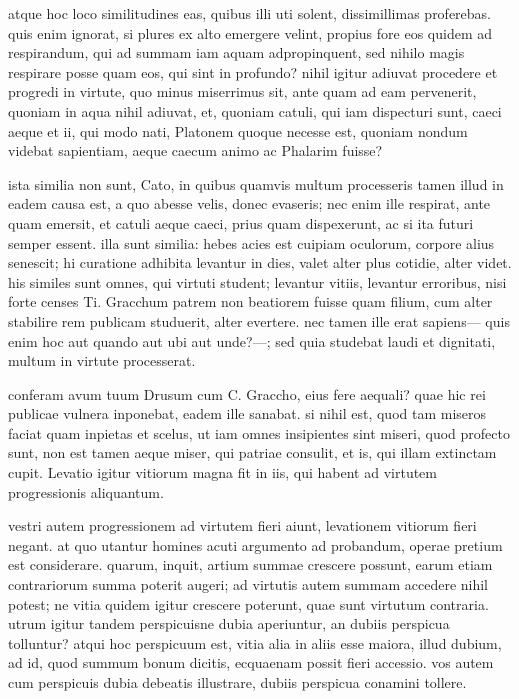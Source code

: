  atque hoc loco similitudines eas, quibus illi uti solent, dissimillimas proferebas. quis enim ignorat, si plures ex alto emergere velint, propius fore eos quidem ad respirandum, qui ad summam iam aquam adpropinquent, sed nihilo magis respirare posse quam eos, qui sint in profundo? nihil igitur adiuvat procedere et progredi in virtute, quo minus miserrimus sit, ante quam ad eam pervenerit, quoniam in aqua nihil adiuvat, et, quoniam catuli, qui iam dispecturi sunt, caeci aeque et ii, qui modo nati, Platonem quoque necesse est, quoniam nondum videbat sapientiam, aeque caecum animo ac Phalarim fuisse?

 ista similia non sunt, Cato, in quibus quamvis multum processeris tamen illud in eadem causa est, a quo abesse velis, donec evaseris; nec enim ille respirat, ante quam emersit, et catuli aeque caeci, prius quam dispexerunt, ac si ita futuri semper essent. illa sunt similia: hebes acies est cuipiam oculorum, corpore alius senescit; hi curatione adhibita levantur in dies, valet alter plus cotidie, alter videt. his similes sunt omnes, qui virtuti student; levantur vitiis, levantur erroribus, nisi forte censes Ti. Gracchum patrem non beatiorem fuisse quam filium, cum alter stabilire rem publicam studuerit, alter evertere. nec tamen ille erat sapiens— quis enim hoc aut quando aut ubi aut unde?—; sed quia studebat laudi et dignitati, multum in virtute processerat.

 conferam avum tuum Drusum cum C. Graccho, eius fere aequali? quae hic rei publicae vulnera inponebat, eadem ille sanabat. si nihil est, quod tam miseros faciat quam inpietas et scelus, ut iam omnes insipientes sint miseri, quod profecto sunt, non est tamen aeque miser, qui patriae consulit, et is, qui illam extinctam cupit. Levatio igitur vitiorum magna fit in iis, qui habent ad virtutem progressionis aliquantum.

 vestri autem progressionem ad virtutem fieri aiunt, levationem vitiorum fieri negant. at quo utantur homines acuti argumento ad probandum, operae pretium est considerare. quarum, inquit, artium summae crescere possunt, earum etiam contrariorum summa poterit augeri; ad virtutis autem summam accedere nihil potest; ne vitia quidem igitur crescere poterunt, quae sunt virtutum contraria. utrum igitur tandem perspicuisne dubia aperiuntur, an dubiis perspicua tolluntur? atqui hoc perspicuum est, vitia alia in aliis esse maiora, illud dubium, ad id, quod summum bonum dicitis, ecquaenam possit fieri accessio. vos autem cum perspicuis dubia debeatis illustrare, dubiis perspicua conamini tollere.

